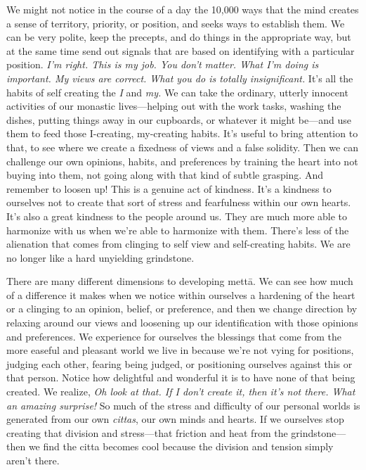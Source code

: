 We might not notice in the course of a day the 10,000 ways that the 
mind creates a sense of territory, priority, or position, and seeks 
ways to establish them. We can be very polite, keep the precepts, and 
do things in the appropriate way, but at the same time send out signals 
that are based on identifying with a particular position. \emph{I'm 
right. This is my job. You don't matter. What I'm doing is important. 
My views are correct. What you do is totally insignificant.} It's all 
the habits of self creating the \emph{I} and \emph{my.} We can take the 
ordinary, utterly innocent activities of our monastic lives---helping 
out with the work tasks, washing the dishes, putting things away in our 
cupboards, or whatever it might be---and use them to feed those 
I-creating, my-creating habits. It's useful to bring attention to that, 
to see where we create a fixedness of views and a false solidity. Then 
we can challenge our own opinions, habits, and preferences by training 
the heart into not buying into them, not going along with that kind of 
subtle grasping. And remember to loosen up! This is a genuine act of 
kindness. It's a kindness to ourselves not to create that sort of 
stress and fearfulness within our own hearts. It's also a great 
kindness to the people around us. They are much more able to harmonize 
with us when we're able to harmonize with them. There's less of the 
alienation that comes from clinging to self view and self-creating 
habits. We are no longer like a hard unyielding grindstone.

There are many different dimensions to developing mettā. We can see 
how much of a difference it makes when we notice within ourselves a 
hardening of the heart or a clinging to an opinion, belief, or 
preference, and then we change direction by relaxing around our views 
and loosening up our identification with those opinions and 
preferences. We experience for ourselves the blessings that come from 
the more easeful and pleasant world we live in because we're not vying 
for positions, judging each other, fearing being judged, or positioning 
ourselves against this or that person. Notice how delightful and 
wonderful it is to have none of that being created. We realize, 
\emph{Oh look at that. If I don't create it, then it's not there. What 
an amazing surprise!} So much of the stress and difficulty of our 
personal worlds is generated from our own \emph{cittas}, our own minds 
and hearts. If we ourselves stop creating that division and 
stress---that friction and heat from the grindstone---then we find the 
citta becomes cool because the division and tension simply aren't there.


